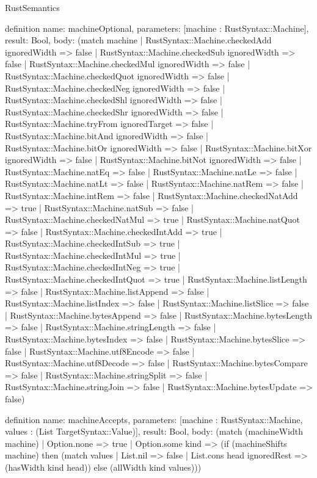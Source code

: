 \begin{lexlean}{RustSemantics}
\begin{semanticmodule}
definition{
  name: machineOptional,
  parameters: [machine : RustSyntax::Machine],
  result: Bool,
  body: (match machine
    | RustSyntax::Machine.checkedAdd ignoredWidth => false
    | RustSyntax::Machine.checkedSub ignoredWidth => false
    | RustSyntax::Machine.checkedMul ignoredWidth => false
    | RustSyntax::Machine.checkedQuot ignoredWidth => false
    | RustSyntax::Machine.checkedNeg ignoredWidth => false
    | RustSyntax::Machine.checkedShl ignoredWidth => false
    | RustSyntax::Machine.checkedShr ignoredWidth => false
    | RustSyntax::Machine.tryFrom ignoredTarget => false
    | RustSyntax::Machine.bitAnd ignoredWidth => false
    | RustSyntax::Machine.bitOr ignoredWidth => false
    | RustSyntax::Machine.bitXor ignoredWidth => false
    | RustSyntax::Machine.bitNot ignoredWidth => false
    | RustSyntax::Machine.natEq => false
    | RustSyntax::Machine.natLe => false
    | RustSyntax::Machine.natLt => false
    | RustSyntax::Machine.natRem => false
    | RustSyntax::Machine.intRem => false
    | RustSyntax::Machine.checkedNatAdd => true
    | RustSyntax::Machine.natSub => false
    | RustSyntax::Machine.checkedNatMul => true
    | RustSyntax::Machine.natQuot => false
    | RustSyntax::Machine.checkedIntAdd => true
    | RustSyntax::Machine.checkedIntSub => true
    | RustSyntax::Machine.checkedIntMul => true
    | RustSyntax::Machine.checkedIntNeg => true
    | RustSyntax::Machine.checkedIntQuot => true
    | RustSyntax::Machine.listLength => false
    | RustSyntax::Machine.listAppend => false
    | RustSyntax::Machine.listIndex => false
    | RustSyntax::Machine.listSlice => false
    | RustSyntax::Machine.bytesAppend => false
    | RustSyntax::Machine.bytesLength => false
    | RustSyntax::Machine.stringLength => false
    | RustSyntax::Machine.bytesIndex => false
    | RustSyntax::Machine.bytesSlice => false
    | RustSyntax::Machine.utf8Encode => false
    | RustSyntax::Machine.utf8Decode => false
    | RustSyntax::Machine.bytesCompare => false
    | RustSyntax::Machine.stringSplit => false
    | RustSyntax::Machine.stringJoin => false
    | RustSyntax::Machine.bytesUpdate => false)
}

definition{
  name: machineAccepts,
  parameters: [machine : RustSyntax::Machine, values : (List TargetSyntax::Value)],
  result: Bool,
  body: (match (machineWidth machine)
    | Option.none => true
    | Option.some kind => (if (machineShifts machine) then (match values
      | List.nil => false
      | List.cons head ignoredRest => (hasWidth kind head)) else (allWidth kind values)))
}


\end{semanticmodule}
\end{lexlean}

